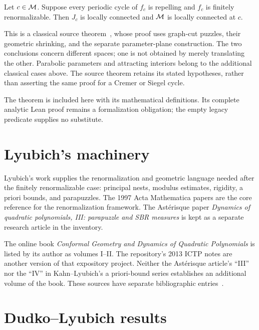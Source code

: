 \begin{theorem}
\label{thm:classical-yoccoz-finite}
Let $c\in\mathcal M$.  Suppose every periodic cycle of $f_c$ is repelling
and $f_c$ is finitely renormalizable.  Then $J_c$ is locally
connected and $\mathcal M$ is locally connected at $c$.
\end{theorem}

This is a classical source theorem~\cite{HubbardYoccoz,DudkoMLC},
whose proof uses graph-cut puzzles, their geometric shrinking, and
the separate parameter-plane construction.  The two conclusions
concern different spaces; one is not obtained by merely translating
the other.  Parabolic parameters and attracting interiors belong
to the additional classical cases above.  The source theorem
retains its stated hypotheses, rather than asserting the same
proof for a Cremer or Siegel cycle.

The theorem is included here with its mathematical definitions.
Its complete analytic Lean proof remains a formalization
obligation; the empty legacy predicate supplies no substitute.

\section{Lyubich's machinery}

Lyubich's work supplies the renormalization and geometric language needed
after the finitely renormalizable case: principal nests, modulus estimates,
rigidity, a priori bounds, and parapuzzles.  The 1997 Acta Mathematica
papers are the core reference for the renormalization framework.  The
Astérisque paper
\emph{Dynamics of quadratic polynomials, III: parapuzzle and SBR measures}
is kept as a separate research article in the inventory.

The online book \emph{Conformal Geometry and Dynamics of Quadratic
Polynomials} is listed by its author as volumes I--II.
The repository's 2013 ICTP notes are another version of that expository
project.  Neither the Astérisque article's ``III'' nor the ``IV'' in
Kahn--Lyubich's a priori-bound series establishes an additional volume
of the book.  These sources have separate bibliographic
entries~\cite{LyubichBook,LyubichNotes,LyubichIII,KahnLyubichElephant}.

\section{Dudko--Lyubich results}

